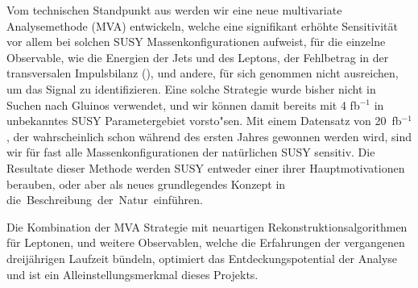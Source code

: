 \documentclass[11pt,a4paper]{article}
\begin{document}
Vom technischen Standpunkt aus werden wir eine neue multivariate Analysemethode (MVA) entwickeln, welche eine signifikant erh\"ohte Sensitivit\"at  
vor allem bei solchen SUSY Massenkonfigurationen aufweist, f\"ur die einzelne Observable, wie die Energien der Jets und des Leptons, der Fehlbetrag in der transversalen Impulsbilanz (\ETmiss), und andere, f\"ur sich genommen nicht ausreichen, um das Signal zu identifizieren.
Eine solche Strategie wurde bisher nicht in Suchen nach Gluinos verwendet, und wir k\"onnen damit bereits mit 4 fb$^{-1}$ in unbekanntes SUSY Parametergebiet  vorsto"sen. 
Mit einem Datensatz von 20~fb$^{-1}$, der wahrscheinlich schon w\"ahrend des ersten Jahres gewonnen werden wird, sind wir f\"ur fast alle Massenkonfigurationen der nat\"urlichen SUSY sensitiv.
Die Resultate dieser Methode werden SUSY entweder einer ihrer Hauptmotivationen berauben, oder aber als neues grundlegendes Konzept in die~Beschreibung~der~Natur~einf\"uhren. %


Die Kombination der MVA Strategie mit neuartigen Rekonstruktionsalgorithmen f\"ur Leptonen, \ETmiss und weitere Observablen, welche
die Erfahrungen der vergangenen dreij\"ahrigen Laufzeit b\"undeln, optimiert das Entdeckungspotential der Analyse und ist ein Alleinstellungsmerkmal dieses Projekts.


\end{document}
